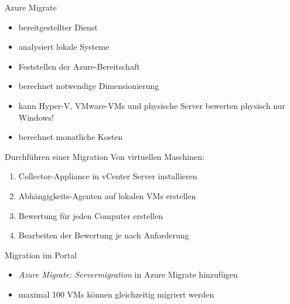 
\begin{flashcard}[Definition]{Azure Migrate}
    \begin{itemize}
        \item bereitgestellter Dienst
        \item analysiert lokale Systeme
        \item Feststellen der Azure-Bereitschaft
        \item berechnet notwendige Dimensionierung
        \item kann Hyper-V, VMware-VMs und physische Server bewerten\newline
            physisch nur Windows!
        \item berechnet monatliche Kosten
    \end{itemize}
\end{flashcard}

\begin{flashcard}[Definition]{Durchführen einer Migration}
    Von virtuellen Maschinen:
    \begin{enumerate}
        \item Collector-Appliance in vCenter Server installieren
        \item Abhängigkeits-Agenten auf lokalen VMs erstellen
        \item Bewertung für jeden Computer erstellen
        \item Bearbeiten der Bewertung je nach Anforderung
    \end{enumerate}
\end{flashcard}

\begin{flashcard}[Definition]{Migration im Portal}
    \begin{itemize}
        \item \emph{Azure Migrate: Servermigration} in Azure Migrate hinzufügen
        \item maximal 100 VMs können gleichzeitig migriert werden
    \end{itemize}
\end{flashcard}

